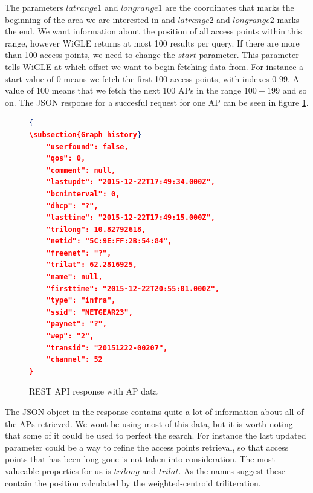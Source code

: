 	The parameters $latrange1$ and $longrange1$ are the coordinates that marks the beginning of the area we are interested in and $latrange2$ and $longrange2$ marks the end. 
	We want information about the position of all access points within this range, however WiGLE returns at most 100 results per query. If there are more than 100 access points, we need to change the $start$
	parameter. This parameter tells WiGLE at which offset we want to begin fetching data from. For instance a start value of $0$ means we fetch the first 100 access points, with indexes 0-99. A value of $100$ means that
	we fetch the next 100 APs in the range $100-199$ and so on. The JSON response for a succesful request for one AP can be seen in figure \ref{fig:wigle}. 

	\begin{figure}[h]

	\begin{lstlisting}[language=json]
{
\subsection{Graph history}
	"userfound": false,
	"qos": 0,
	"comment": null,
	"lastupdt": "2015-12-22T17:49:34.000Z",
	"bcninterval": 0,
	"dhcp": "?",
	"lasttime": "2015-12-22T17:49:15.000Z",
	"trilong": 10.82792618,
	"netid": "5C:9E:FF:2B:54:84",
	"freenet": "?",
	"trilat": 62.2816925,
	"name": null,
	"firsttime": "2015-12-22T20:55:01.000Z",
	"type": "infra",
	"ssid": "NETGEAR23",
	"paynet": "?",
	"wep": "2",
	"transid": "20151222-00207",
	"channel": 52
}

\end{lstlisting}
\caption{REST API response with AP data}
\label{fig:wigle}
\end{figure}

The JSON-object in the response contains quite a lot of information about all of the APs retrieved. We wont be using most of this data, but it is worth noting that some of it could be used to perfect the search. For instance the last updated parameter could
be a way to refine the access points retrieval, so that access points that has been long gone is not taken into consideration. The most valueable properties for us is $trilong$ and $trilat$. As the names suggest these contain the position calculated
by the weighted-centroid triliteration. 

